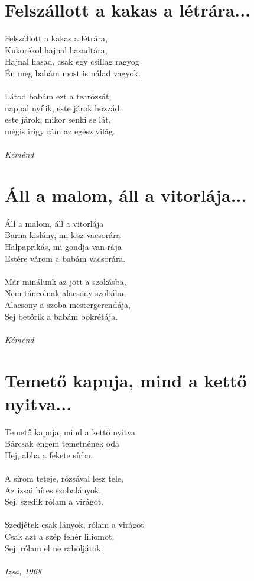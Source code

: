 \section{Felszállott a kakas a létrára...}
Felszállott a kakas a létrára,\\
Kukorékol hajnal hasadtára,\\
Hajnal hasad, csak egy csillag ragyog\\
Én meg babám most is nálad vagyok.\\\\
Látod babám ezt a tearózsát,\\
nappal nyílik, este járok hozzád,\\
este járok, mikor senki se lát,\\
mégis irigy rám az egész világ.\\\\
\textit{Kéménd}

\section{Áll a malom, áll a vitorlája...}
Áll a malom, áll a vitorlája\\
Barna kislány, mi lesz vacsorára\\
Halpaprikás, mi gondja van rája\\
Estére várom a babám vacsorára.\\\\
Már minálunk az jött a szokásba,\\
Nem táncolnak alacsony szobába,\\
Alacsony a szoba mestergerendája,\\
Sej betörik a babám bokrétája.\\\\
\textit{Kéménd}

\section{Temető kapuja, mind a kettő nyitva...}
Temető kapuja, mind a kettő nyitva\\
Bárcsak engem temetnének oda\\
Hej, abba a fekete sírba.\\\\
A sírom teteje, rózsával lesz tele,\\
Az izsai híres szobalányok,\\
Sej, szedik rólam a virágot.\\\\
Szedjétek csak lányok, rólam a virágot\\
Csak azt a szép fehér liliomot,\\
Sej, rólam el ne raboljátok.\\\\
\textit{Izsa, 1968}

